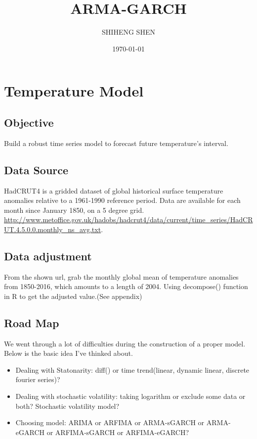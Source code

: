 \documentclass[a4paper,10pt]{article}
\title{ARMA-GARCH}
\author{SHIHENG SHEN}
\date{\today}
\begin{document}
\maketitle

\section{Temperature Model}
\subsection{Objective}
Build a robust time series model to forecast future temperature's interval. 


\subsection{Data Source}
HadCRUT4 is a gridded dataset of global historical surface temperature anomalies relative to a 1961-1990 reference period. Data are available for each month since January 1850, on a 5 degree grid. \url{http://www.metoffice.gov.uk/hadobs/hadcrut4/data/current/time_series/HadCRUT.4.5.0.0.monthly_ns_avg.txt}.

\subsection{Data adjustment}
From the shown url, grab the monthly global mean of temperature anomalies from 1850-2016, which amounts to a length of 2004. Using decompose() function in R to get the adjusted value.(See appendix)  

\subsection{Road Map}
We went through a lot of difficulties during the construction of a proper model. Below is the basic idea I've thinked about.\par
\begin{itemize}
\item Dealing with Statonarity: diff() or time trend(linear, dynamic linear, discrete fourier series)?
\item Dealing with stochastic volatility: taking logarithm or exclude some data or both? Stochastic volatility model?
\item Choosing model: ARIMA or ARFIMA or ARMA-sGARCH or ARMA-eGARCH or ARFIMA-sGARCH or ARFIMA-eGARCH?
\end{itemize}
\end{document}
